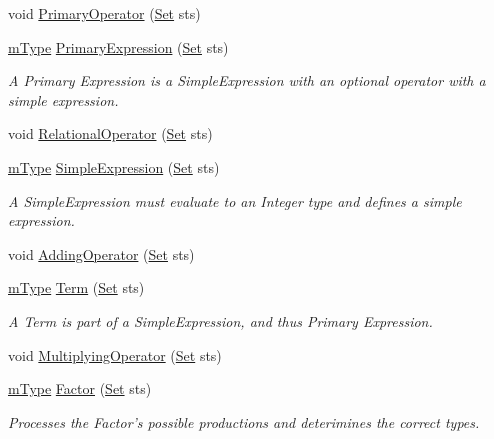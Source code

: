 \begin{DoxyCompactItemize}
void \hyperlink{classParser_a7ac200c2e0ac927e115027fb593ac72d}{PrimaryOperator} (\hyperlink{classSet}{Set} sts)
\item 
\hyperlink{blocktable_8h_a636cfca014f3212ea82d45e28f9cb51b}{mType} \hyperlink{classParser_a293b721a8e832a137e495a6a2178188e}{PrimaryExpression} (\hyperlink{classSet}{Set} sts)
\begin{DoxyCompactList}\small\item\em A Primary Expression is a SimpleExpression with an optional operator with a simple expression. \item\end{DoxyCompactList}\item 
void \hyperlink{classParser_ab68b61bab0a323b67457d520578cb853}{RelationalOperator} (\hyperlink{classSet}{Set} sts)
\item 
\hyperlink{blocktable_8h_a636cfca014f3212ea82d45e28f9cb51b}{mType} \hyperlink{classParser_a9952c751bac78c4e0b3db7be474ed099}{SimpleExpression} (\hyperlink{classSet}{Set} sts)
\begin{DoxyCompactList}\small\item\em A SimpleExpression must evaluate to an Integer type and defines a simple expression. \item\end{DoxyCompactList}\item 
void \hyperlink{classParser_a909c968479dd3bafe797f2409e197179}{AddingOperator} (\hyperlink{classSet}{Set} sts)
\item 
\hyperlink{blocktable_8h_a636cfca014f3212ea82d45e28f9cb51b}{mType} \hyperlink{classParser_a55466d8b3d146f56c56e8eb53559e4b1}{Term} (\hyperlink{classSet}{Set} sts)
\begin{DoxyCompactList}\small\item\em A Term is part of a SimpleExpression, and thus Primary Expression. \item\end{DoxyCompactList}\item 
void \hyperlink{classParser_a0f016865b3ae30a62a06abbb7fca7345}{MultiplyingOperator} (\hyperlink{classSet}{Set} sts)
\item 
\hyperlink{blocktable_8h_a636cfca014f3212ea82d45e28f9cb51b}{mType} \hyperlink{classParser_a071f2167f08d7bb2838ce98e67dfcc99}{Factor} (\hyperlink{classSet}{Set} sts)
\begin{DoxyCompactList}\small\item\em Processes the Factor's possible productions and deterimines the correct types. \item\end{DoxyCompactList}\item 

\end{DoxyCompactItemize}
